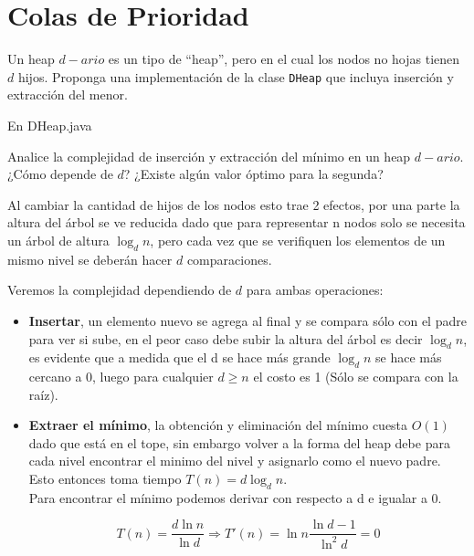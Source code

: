 \documentclass[dcc,sol]{fcfmcourse}
\begin{document}
\section*{Colas de Prioridad}
\begin{problems}
\problem Un heap $d-ario$ es un tipo de ``heap'', pero en el cual los nodos no hojas tienen $d$ hijos. Proponga una implementación de la clase \texttt{DHeap} que incluya inserción y extracción del menor.
\begin{solution}
En DHeap.java
\end{solution}
\problem Analice la complejidad de inserción y extracción del mínimo en un heap $d-ario$. ¿Cómo depende de $d$? ¿Existe algún valor óptimo para la segunda?

\begin{solution}
Al cambiar la cantidad de hijos de los nodos esto trae 2 efectos, por una parte la altura del árbol se ve reducida dado que para representar n nodos solo se necesita un árbol de altura $\log_d{n}$, pero cada vez que se verifiquen los elementos de un mismo nivel se deberán hacer $d$ comparaciones.

Veremos la complejidad dependiendo de $d$ para ambas operaciones:

\begin{itemize}

\item \textbf{Insertar}, un elemento nuevo se agrega al final y se compara sólo con el padre para ver si sube, en el peor caso debe subir la altura del árbol es decir $\log_d{n}$, es evidente que a medida que el d se hace más grande $\log_d{n}$ se hace más cercano a 0, luego para cualquier $d\geq n$ el costo es 1 (Sólo se compara con la raíz). \\

\item \textbf{Extraer el mínimo}, la obtención y eliminación del mínimo cuesta $O(1)$ dado que está en el tope, sin embargo volver a la forma del heap debe para cada nivel encontrar el minimo del nivel y asignarlo como el nuevo padre. Esto entonces toma tiempo $T(n) = d\log_d{n}$. \\

Para encontrar el mínimo podemos derivar con respecto a d e igualar a 0.

\begin{equation*}
    T(n) = \frac{d\ln{n}}{\ln{d}} \Rightarrow
    T'(n) = \ln{n}\frac{\ln{d}-1}{\ln^2{d}} = 0
\end{equation*}


\end{itemize}
\end{solution}
\end{problems}
\end{document}
